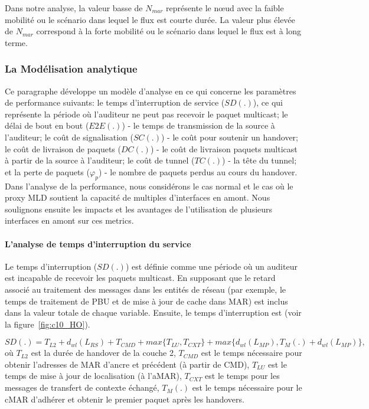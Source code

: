 Dans notre analyse, la valeur basse de $ N_{mar} $ représente le nœud avec la faible mobilité ou le scénario dans lequel le flux est courte durée. La valeur plus élevée de $ N_{mar} $ correspond à la forte mobilité ou le scénario dans lequel le flux est à long terme.

\subsubsection{La Modélisation analytique}
Ce paragraphe développe un modèle d'analyse en ce qui concerne les paramètres de performance suivants: le temps d'interruption de service ($ SD(.)$), ce qui représente la période où l'auditeur ne peut pas recevoir le paquet multicast; le délai de bout en bout ($E2E(.)$) - le temps de transmission de la source à l'auditeur; le coût de signalisation ($ SC(.)$) - le coût pour soutenir un handover; le coût de livraison de paquets ($ DC(.) $) - le coût de livraison paquets multicast à partir de la source à l'auditeur; le coût de tunnel ($ TC(.) $) - la tête du tunnel; et la perte de paquets ($ \varphi_{p} $) - le nombre de paquets perdus au cours du handover. Dans l'analyse de la performance, nous considérons le cas normal et le cas où le proxy MLD soutient la capacité de multiples d'interfaces en amont. Nous soulignons ensuite les impacts et les avantages de l'utilisation de plusieurs interfaces en amont sur ​​ces metrics.

\paragraph{L'analyse de temps d'interruption du service}
Le temps d'interruption ($ SD(.)$) est définie comme une période où un auditeur est incapable de recevoir les paquets multicast. En supposant que le retard associé au traitement des messages dans les entités de réseau (par exemple, le temps de traitement de PBU et de mise à jour de cache dans MAR) est inclus dans la valeur totale de chaque variable. Ensuite, le temps d'interruption est (voir la figure~\ref{fig:c10_HO}). \ \

\small
\begin{equation}
SD(.) = T_{L2} + d_{wl}(L_{RS}) +T_{CMD} + max \{ T_{LU}, T_{CXT}\}  +max \{d_{wl}(L_{MP}), T_{M}{(.)} + d_{wl}(L_{MP})\},
\label{eq:sd}
\end{equation}
\normalsize
où $ T_{L2} $ est la durée de handover de la couche 2, $ T_{CMD} $ est le temps nécessaire pour obtenir l'adresses de MAR d'ancre et précédent (à partir de CMD), $T_{LU} $ est le temps de mise à jour de localisation (à l'aMAR), $T_{CXT} $ est le temps pour les messages de transfert de contexte échangé, $T_{M} (.)$ est le temps nécessaire pour le cMAR d'adhérer et obtenir le premier paquet après les handovers.


